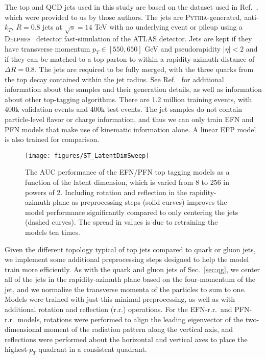 \documentclass[letterpaper,11pt]{article}
\DeclareRobustCommand{\Sec}[1]{Sec.~\ref{#1}}
\DeclareRobustCommand{\Ref}[1]{Ref.~\cite{#1}}
\newcommand{\pythia}{\textsc{Pythia}\xspace}
\begin{document}
The top and QCD jets used in this study are based on the dataset used in \Ref{Butter:2017cot}, which were provided to us by those authors.
%
The jets are \pythia-generated, anti-$k_T$, $R=0.8$ jets at $\sqrt{s}=14$ TeV with no underlying event or pileup using a \textsc{Delphes}~\cite{deFavereau:2013fsa} detector fast-simulation of the ATLAS detector.
%
Jets are kept if they have transverse momentum $p_T\in [550,650]$ GeV and pseudorapidity $|\eta|<2$ and if they can be matched to a top parton to within a rapidity-azimuth distance of $\Delta R = 0.8$.
%
The jets are required to be fully merged, with the three quarks from the top decay contained within the jet radius.
%
See \Ref{Butter:2017cot} for additional information about the samples and their generation details, as well as information about other top-tagging algorithms.
%
There are 1.2 million training events, with 400k validation events and 400k test events.
%
The jet samples do not contain particle-level flavor or charge information, and thus we can only train EFN and PFN models that make use of kinematic information alone.
%
A linear EFP model is also trained for comparison.


\begin{figure}[t]
\centering
\texttt{[image: figures/ST\_LatentDimSweep]}
\caption{The AUC performance of the EFN/PFN top tagging models as a function of the latent dimension, which is varied from 8 to 256 in powers of 2.
%
Including rotation and reflection in the rapidity-azimuth plane as preprocessing steps (solid curves) improves the model performance significantly compared to only centering the jets (dashed curves).
%
The spread in values is due to retraining the models ten times.}
\label{fig:topdimsweep}
\end{figure}


Given the different topology typical of top jets compared to quark or gluon jets, we implement some additional preprocessing steps designed to help the model train more efficiently.
%
As with the quark and gluon jets of \Sec{sec:qg}, we center all of the jets in the rapidity-azimuth plane based on the four-momentum of the jet, and we normalize the transverse momenta of the particles to sum to one.
%
Models were trained with just this minimal preprocessing, as well as with additional rotation and reflection (r.r.) operations.
%
For the EFN-r.r.\ and PFN-r.r.\ models, rotations were performed to align the leading eigenvector of the two-dimensional moment of the radiation pattern along the vertical axis, and reflections were performed about the horizontal and vertical axes to place the highest-$p_T$ quadrant in a consistent quadrant.
\end{document}
